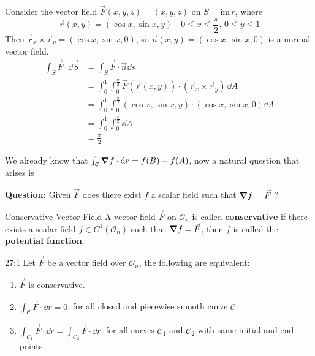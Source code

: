 \documentclass[../Analysis-3]{subfiles}
\begin{document}
\begin{Eg}{}{}
    Consider the vector field $\vec{F}(x,y,z) = (x,y,z)$ on $S = \mathrm{im} \, r$, where
    \[
        \vec{r}(x,y) = (\cos x, \sin x, y) \quad 0 \leq x \leq \frac{\pi}{2}, \, 0 \leq y \leq 1
    \]
    Then $\vec{r}_x \times \vec{r}_y = (\cos x, \sin x, 0)$, so $\vec{n}(x,y) = (\cos x, \sin x, 0)$ is a normal vector field.
    \begin{align*}
        \int_S \vec{F} \cdot \dd \vec{S} & = \int_S \vec{F} \cdot \vec{n} \dd s                                                                \\
                                         & = \int_0^1 \int_0^{\frac{\pi}{2}} \vec{F}(\vec{r}(x,y)) \cdot (\vec{r}_x \times \vec{r}_y) \, \dd A \\
                                         & = \int_0^1 \int_0^{\frac{\pi}{2}}  (\cos x, \sin x, y) \cdot (\cos x, \sin x, 0) \dd A              \\
                                         & = \int_0^1 \int_{0}^{\frac{\pi}{2}} \dd A                                                           \\
                                         & = \frac{\pi}{2}
    \end{align*}
\end{Eg}

We already know that $\int_{\mathcal{C}} \grad f \cdot \dd r = f(B) - f(A)$, now a natural question that arises is

\textbf{Question:} Given $\vec{F}$ does there exist $f$ a scalar field such that $\grad f = \vec{F}$ ?

\begin{Def}{Conservative Vector Field}{}
    A vector field $\vec{F}$ on $\mathcal{O}_n$ is called \textbf{conservative} if there exists a scalar field $f \in C^1(\mathcal{O}_n)$ such that $\grad f = \vec{F}$, then $f$ is called the \textbf{potential function}.
\end{Def}

\begin{Thm}{}{27:1}
    Let $\vec{F}$ be a vector field over $\mathcal{O}_n$, the following are equivalent:
    \begin{enumerate}
        \item $\vec{F}$ is conservative.
        \item $\int_{\mathcal{C}}\vec{F} \cdot \dd r = 0$, for all closed and piecewise smooth curve $\mathcal{C}$.
        \item $\int_{\mathcal{C}_1} \vec{F} \cdot \dd r = \int_{\mathcal{C}_2} \vec{F} \cdot \dd r$, for all curves $\mathcal{C}_1$ and $\mathcal{C}_2$ with same initial and end points.
    \end{enumerate}
\end{Thm}
\end{document}
